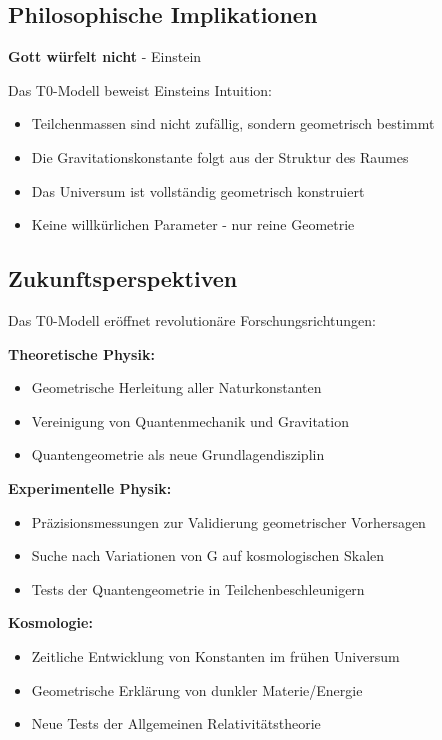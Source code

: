\documentclass[12pt,a4paper]{article}
\begin{document}
	\subsection{Philosophische Implikationen}
	
	\begin{tcolorbox}[colback=blue!5!white,colframe=blue!75!black,title=Einsteins Vision erfüllt]
		\textbf{Gott würfelt nicht} - Einstein
		
		Das T0-Modell beweist Einsteins Intuition:
		\begin{itemize}
			\item Teilchenmassen sind nicht zufällig, sondern geometrisch bestimmt
			\item Die Gravitationskonstante folgt aus der Struktur des Raumes
			\item Das Universum ist vollständig geometrisch konstruiert
			\item Keine willkürlichen Parameter - nur reine Geometrie
		\end{itemize}
	\end{tcolorbox}
	
	\subsection{Zukunftsperspektiven}
	
	Das T0-Modell eröffnet revolutionäre Forschungsrichtungen:
	
	\textbf{Theoretische Physik:}
	\begin{itemize}
		\item Geometrische Herleitung aller Naturkonstanten
		\item Vereinigung von Quantenmechanik und Gravitation
		\item Quantengeometrie als neue Grundlagendisziplin
	\end{itemize}
	
	\textbf{Experimentelle Physik:}
	\begin{itemize}
		\item Präzisionsmessungen zur Validierung geometrischer Vorhersagen
		\item Suche nach Variationen von G auf kosmologischen Skalen
		\item Tests der Quantengeometrie in Teilchenbeschleunigern
	\end{itemize}
	
	\textbf{Kosmologie:}
	\begin{itemize}
		\item Zeitliche Entwicklung von Konstanten im frühen Universum
		\item Geometrische Erklärung von dunkler Materie/Energie
		\item Neue Tests der Allgemeinen Relativitätstheorie
	\end{itemize}
	
\end{document}

